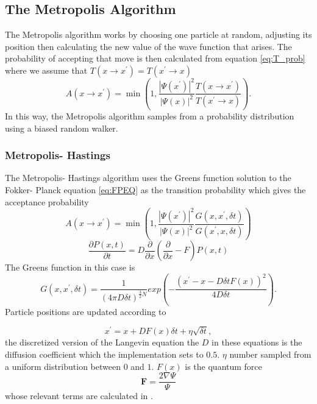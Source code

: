 \documentclass[11pt,a4paper,titlepage]{article}
\begin{document}
\subsection{The Metropolis Algorithm}
The Metropolis algorithm works by choosing one particle at random, adjusting its position then calculating the new value of the wave function that arises. The probability of accepting that move is then calculated from equation \eqref{eq:T_prob} where we assume that $ T\left(x\rightarrow x^{\prime}\right)= T\left(x^{\prime}\rightarrow x\right)$
\begin{equation}
A\left(x\rightarrow x^{\prime}\right)=\min \left(1, \frac{|\Psi\left(x^{\prime}\right)|^2}{|\Psi\left(x\right)|^2} \frac{T\left(x\rightarrow x^{\prime}\right)}{T\left(x^{\prime}\rightarrow x\right)}\right).\label{eq:T_prob}
\end{equation}
In this way, the Metropolis algorithm samples from a probability distribution using a biased random walker\cite{Project1}.
\subsubsection{Metropolis- Hastings}
The Metropolis- Hastings algorithm uses the Greens function solution to the Fokker- Planck equation \eqref{eq:FPEQ} as the transition probability which gives the acceptance probability
\begin{equation}
A\left(x\rightarrow x^{\prime}\right)=\min \left(1, \frac{|\Psi\left(x^{\prime}\right)|^2}{|\Psi\left(x\right)|^2} \frac{G\left(x,x^{\prime},\delta t\right)}{G\left(x^{\prime},x,\delta t\right)}\right)\label{eq:A_prob}
\end{equation}
\begin{equation}
\frac{\partial P(x, t)}{\partial t}=D \frac{\partial}{\partial x}\left(\frac{\partial}{\partial x}-F\right) P(x, t)\label{eq:FPEQ}
\end{equation}
The Greens function in this case is 
\begin{equation}
G\left(x,x^{\prime},\delta t\right) = \frac{1}{(4\pi D\delta t)^{\frac{3}{2}N}} exp{\left( -\frac{\left( x^{\prime}-x-D\delta t F(x) \right)^2}{4D\delta t} \right)}.\label{eq:green}
\end{equation}
Particle positions are updated according to 

\begin{equation}
x^{\prime} = x + DF(x)\delta t + \eta \sqrt{\delta t},\label{eq:Langevin_discrete}
\end{equation}
the discretized version of the Langevin equation
the $D$ in these equations is the diffusion coefficient which the implementation sets to $0.5$. $\eta$ number sampled from a uniform distribution between $0$ and $1$. $F(x)$ is the quantum force 
\begin{equation}
\mathbf{F}=\frac{2 \nabla \Psi}{\Psi}
\end{equation}
\cite{Project1} whose relevant terms are calculated in .
\end{document}
